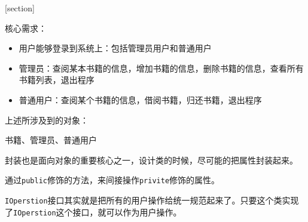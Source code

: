 \documentclass[a4paper]{report}
\begin{document}
\flushbottom%
\newcommand{\dm}[1]{\colorbox{wgray}{\lstinline`#1`}}
\newcommand{\myroman}[1]{\uppercase\expandafter{\romannumeral#1}}
[section] \renewcommand{\thenum}{\arabic{num}.} \newcommand{\num}{\refstepcounter{num}\text{\thenum}}

\newenvironment{tips}{\kaishu\zihao{-6}\color{blue}{\noindent\rule[-3pt]{\textwidth}{0.5pt}\par \em \noindent {\zihao{-5} \textcolor[rgb]{1.00,0.00,0.00}{Tips}}}\par}{\\ \rule[3mm]{\textwidth}{0.5pt}\par}

\newenvironment{zhengming}{\kaishu\zihao{-5}\color{blue}{\noindent\em 证明：}\par}{\hfill $\diamondsuit$\par}


核心需求：
\begin{itemize}
\itemsep=0pt \parskip=0pt
  \item 用户能够登录到系统上：包括管理员用户和普通用户
  \item 管理员：查阅某本书籍的信息，增加书籍的信息，删除书籍的信息，查看所有书籍列表，退出程序
  \item 普通用户：查阅某个书籍的信息，借阅书籍，归还书籍，退出程序
\end{itemize}
上述所涉及到的对象：

书籍、管理员、普通用户

封装也是面向对象的重要核心之一，设计类的时候，尽可能的把属性封装起来。

通过\dm{public}修饰的方法，来间接操作\dm{privite}修饰的属性。

\dm{IOperstion}接口其实就是把所有的用户操作给统一规范起来了。只要这个类实现了\dm{IOperstion}这个接口，就可以作为用户操作。
\end{document}
